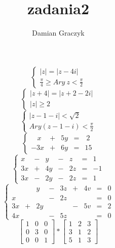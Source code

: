 \documentclass{article}
\begin{document}
\title{zadania2}
\author{Damian Graczyk}
\maketitle
\begin{equation}
	\begin{cases}
	|z| = |z-4i|\\
	\frac{\pi}{4} \ge Ary\ z < \frac{\pi}{2}
	\end{cases}
\end{equation}
\begin{equation}
	\begin{cases}
	|z+4|=|z+2-2i|\\
	|z| \ge 2
	\end{cases}
\end{equation}
\begin{equation}
	\begin{cases}
	|z-1-i| < \sqrt{2}\\
	Ary(z-1-i) < \frac{\pi}{2}
	\end{cases}
\end{equation}
\begin{equation}
	\left\{
	\begin{array}{ccccc}
	\ \ \ \ x & + & 5y & = & \ 2 \\
	-3x & + & 6y & = & 15
	\end{array}
	\right.
\end{equation}
\begin{equation}
	\left\{
	\begin{array}{ccccccc}
	x & - & y & - & z & = & 1 \\
	3x&+&4y&-&2z&=&-1 \\
	3x&-&2y&-&2z&=&1
	\end{array}
	\right.
\end{equation}
\begin{equation}
	\left\{
	\begin{array}{ccccccccc}
	&&y&-&3z&+&4v&=&0 \\
	x&&&-&2z&&&=&0 \\
	3x&+&2y&&&-&5v&=&2 \\
	4x&&&-&5z&&&=&0
	\end{array}
	\right.
\end{equation}
\begin{equation}
	\left[
	\begin{array}{ccc}
	1&0&0 \\
	0&3&0 \\
	0&0&1
	\end{array}
	\right]
	*
	\left[
	\begin{array}{ccc}
	1&2&3 \\
	3&1&2 \\
	5&1&3
	\end{array}
	\right]
\end{equation}
\end{document}
